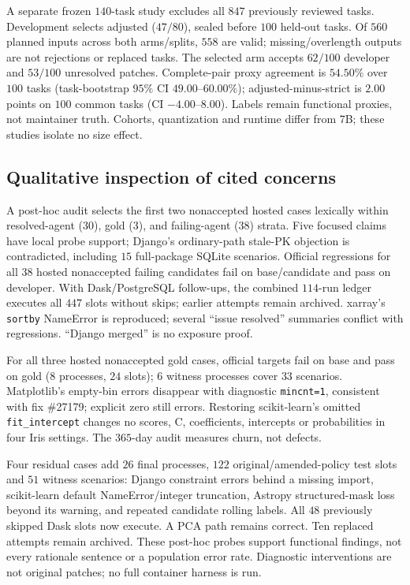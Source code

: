\documentclass[10pt,conference]{IEEEtran}
\begin{document}
A separate frozen $140$-task study excludes all $847$ previously reviewed tasks.
Development selects adjusted ($47/80$), sealed
before $100$ held-out tasks. Of $560$ planned inputs across both arms/splits,
$558$ are valid;
missing/overlength outputs are not rejections or replaced tasks. The selected arm
accepts $62/100$ developer and
$53/100$ unresolved patches.
Complete-pair proxy agreement is $54.50\%$ over
$100$ tasks (task-bootstrap $95\%$ CI $49.00$--$60.00\%$);
adjusted-minus-strict is $2.00$ points on $100$ common tasks
(CI $-4.00$--$8.00$). Labels remain functional proxies, not maintainer truth.
Cohorts, quantization and runtime differ from 7B; these studies isolate no size effect.

\subsection{Qualitative inspection of cited concerns}
A post-hoc audit selects the first two nonaccepted hosted cases lexically
within resolved-agent ($30$), gold ($3$), and failing-agent ($38$) strata.
Five focused claims have local probe support; Django's ordinary-path stale-PK objection is
contradicted, including $15$ full-package SQLite scenarios. Official regressions
for all $38$ hosted nonaccepted failing candidates fail on base/candidate and
pass on developer. With Dask/PostgreSQL follow-ups, the combined $114$-run
ledger executes all $447$ slots without skips; earlier attempts remain archived.
xarray's \texttt{sortby} NameError is reproduced; several ``issue resolved''
summaries conflict with regressions. ``Django merged'' is no exposure proof.

For all three hosted nonaccepted gold cases, official targets fail on base and
pass on gold ($8$ processes, $24$ slots); $6$ witness processes cover $33$ scenarios.
Matplotlib's empty-bin errors disappear with diagnostic \texttt{mincnt=1},
consistent with fix \#27179; explicit zero still errors. Restoring scikit-learn's
omitted \texttt{fit\_intercept} changes no scores, C, coefficients, intercepts
or probabilities in four Iris settings. The $365$-day audit measures churn, not defects.

Four residual cases add $26$ final processes, $122$ original/amended-policy test
slots and $51$ witness scenarios: Django constraint errors behind a missing import,
scikit-learn default NameError/integer truncation, Astropy structured-mask loss
beyond its warning, and repeated candidate rolling labels. All $48$ previously skipped
Dask slots now execute. A PCA path remains correct. Ten replaced attempts remain archived.
These post-hoc probes support functional findings, not every rationale sentence
or a population error rate. Diagnostic interventions are not original patches;
no full container harness is run.
\end{document}
